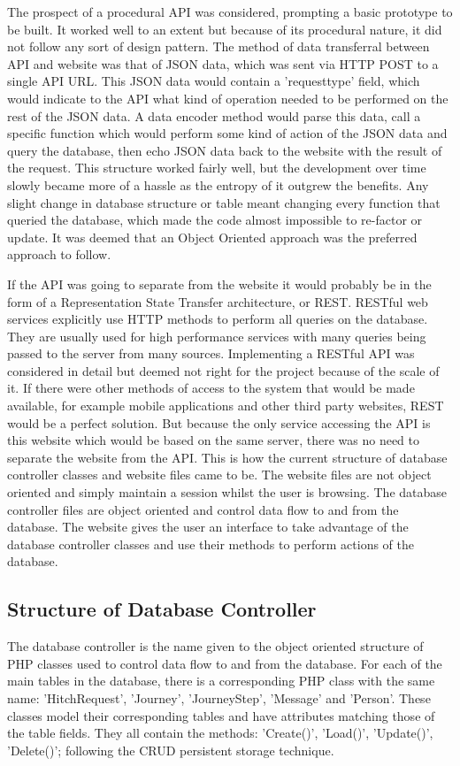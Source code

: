 		The prospect of a procedural API was considered, prompting a basic prototype to be built. It worked well to an extent but because of its procedural nature, it did not follow any sort of design pattern. The method of data transferral between API and website was that of JSON data, which was sent via HTTP POST to a single API URL. This JSON data would contain a 'request\textunderscore type' field, which would indicate to the API what kind of operation needed to be performed on the rest of the JSON data. A data encoder method would parse this data, call a specific function which would perform some kind of action of the JSON data and query the database, then echo JSON data back to the website with the result of the request. This structure worked fairly well, but the development over time slowly became more of a hassle as the entropy of it outgrew the benefits. Any slight change in database structure or table meant changing every function that queried the database, which made the code almost impossible to re-factor or update. It was deemed that an Object Oriented approach was the preferred approach to follow. 
		
		If the API was going to separate from the website it would probably be in the form of a Representation State Transfer architecture, or REST. RESTful web services explicitly use HTTP methods to perform all queries on the database. They are usually used for high performance services with many queries being passed to the server from many sources. Implementing a RESTful API was considered in detail but deemed not right for the project because of the scale of it. If there were other methods of access to the system that would be made available, for example mobile applications and other third party websites, REST would be a perfect solution. But because the only service accessing the API is this website which would be based on the same server, there was no need to separate the website from the API. This is how the current structure of database controller classes and website files came to be. The website files are not object oriented and simply maintain a session whilst the user is browsing. The database controller files are object oriented and control data flow to and from the database. The website gives the user an interface to take advantage of the database controller classes and use their methods to perform actions of the database.
		
	\subsection{Structure of Database Controller}
		The database controller is the name given to the object oriented structure of PHP classes used to control data flow to and from the database. For each of the main tables in the database, there is a corresponding PHP class with the same name: 'Hitch\textunderscore Request', 'Journey', 'Journey\textunderscore Step', 'Message' and 'Person'. These classes model their corresponding tables and have attributes matching those of the table fields. They all contain the methods: 'Create()', 'Load()', 'Update()', 'Delete()'; following the CRUD persistent storage technique\cite{crud_technique}. 

